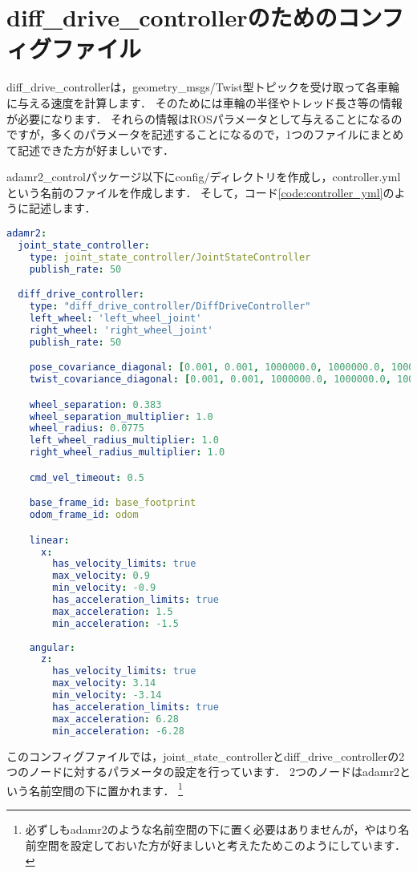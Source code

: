 \documentclass[{../../master}]{subfiles}
\begin{document}
\section{\textsf{diff\_drive\_controller}のためのコンフィグファイル}

\textsf{diff\_drive\_controller}は，\textsf{geometry\_msgs/Twist}型トピックを受け取って各車輪に与える速度を計算します．
そのためには車輪の半径やトレッド長さ等の情報が必要になります．
それらの情報はROSパラメータとして与えることになるのですが，多くのパラメータを記述することになるので，1つのファイルにまとめて記述できた方が好ましいです．

\textsf{adamr2\_control}パッケージ以下に\textsf{config/}ディレクトリを作成し，\textsf{controller.yml}という名前のファイルを作成します．
そして，コード\ref{code:controller_yml}のように記述します．

\begin{lstlisting}[language=YAML, label=code:controller_yml, caption=\textsf{controller.yml}]
adamr2:
  joint_state_controller:
    type: joint_state_controller/JointStateController
    publish_rate: 50

  diff_drive_controller:
    type: "diff_drive_controller/DiffDriveController"
    left_wheel: 'left_wheel_joint'
    right_wheel: 'right_wheel_joint'
    publish_rate: 50

    pose_covariance_diagonal: [0.001, 0.001, 1000000.0, 1000000.0, 1000000.0, 10.0]
    twist_covariance_diagonal: [0.001, 0.001, 1000000.0, 1000000.0, 1000000.0, 10.0]

    wheel_separation: 0.383
    wheel_separation_multiplier: 1.0
    wheel_radius: 0.0775
    left_wheel_radius_multiplier: 1.0
    right_wheel_radius_multiplier: 1.0

    cmd_vel_timeout: 0.5

    base_frame_id: base_footprint
    odom_frame_id: odom

    linear:
      x:
        has_velocity_limits: true
        max_velocity: 0.9
        min_velocity: -0.9
        has_acceleration_limits: true
        max_acceleration: 1.5
        min_acceleration: -1.5
      
    angular:
      z:
        has_velocity_limits: true
        max_velocity: 3.14
        min_velocity: -3.14
        has_acceleration_limits: true
        max_acceleration: 6.28
        min_acceleration: -6.28
\end{lstlisting}

このコンフィグファイルでは，\textsf{joint\_state\_controller}と\textsf{diff\_drive\_controller}の2つのノードに対するパラメータの設定を行っています．
2つのノードは\textsf{adamr2}という名前空間の下に置かれます．
\footnote{必ずしも\textsf{adamr2}のような名前空間の下に置く必要はありませんが，やはり名前空間を設定しておいた方が好ましいと考えたためこのようにしています．}
\end{document}
